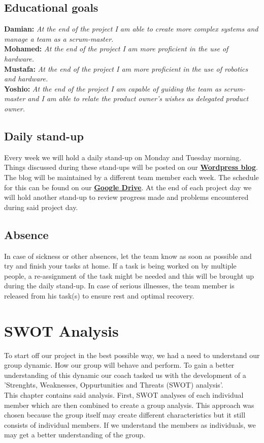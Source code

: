 \documentclass[12pt]{article}
\begin{document}
	\subsection{Educational goals}
	\textbf{Damian: }\emph{At the end of the project I am able to create more complex systems and manage a team as a scrum-master.}\\
	\textbf{Mohamed: }\emph{At the end of the project I am more proficient in the use of hardware.}\\
	\textbf{Mustafa: }\emph{At the end of the project I am more proficient in the use of robotics and hardware.}\\
	\textbf{Yoshio: }\emph{At the end of the project I am capable of guiding the team as scrum-master and I am able to relate the product owner's wishes as delegated product owner.}
	\subsection{Daily stand-up}
	Every week we will hold a daily stand-up on Monday and Tuesday morning. Things discussed during these stand-ups will be posted on our \href{https://metabotsrow.wordpress.com/}{\textbf{Wordpress blog}}. The blog will be maintained by a different team member each week. The schedule for this can be found on our \href{https://drive.google.com/drive/folders/1IJEu7igVdK12MzVx3jkXZMvB5HUXFuYZ?usp=sharing}{\textbf{Google Drive}}. At the end of each project day we will hold another stand-up to review progress made and problems encountered during said project day.
	\subsection{Absence}
	In case of sickness or other absences, let the team know as soon as possible and try and finish your tasks at home. If a task is being worked on by multiple people, a re-assignment of the task might be needed and this will be brought up during the daily stand-up. In case of serious illnesses, the team member is released from his task(s) to ensure rest and optimal recovery.
	\newpage
	\section{SWOT Analysis}
	To start off our project in the best possible way, we had a need to understand our group dynamic. How our group will behave and perform. To gain a better understanding of this dynamic our coach tasked us with the development of a 'Strenghts, Weaknesses, Oppurtunities and Threats (SWOT) analysis'.\\ This chapter contains said analysis. First, SWOT analyses of each individual member which are then combined to create a group analysis. This approach was chosen because the group itself may create different characteristics but it still consists of individual members. If we understand the members as individuals, we may get a better understanding of the group. 
\end{document}
